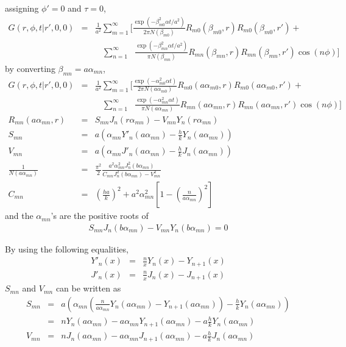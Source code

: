 \documentclass{article}
\begin{document}
assigning $\phi' = 0$ and $\tau = 0$,
\begin{eqnarray}
    G(r, \phi, t | r', 0, 0) &=&
    \frac{1}{a^2} \sum_{m=1}^{\infty} \Bigg[
    \frac{\exp(-\beta_{m0}^2\alpha t/a^2)}{2\pi N(\beta_{m0})}
    R_{m0}(\beta_{m0}, r) R_{m0}(\beta_{m0}, r') +
\nonumber\\
    & &\ \ \ \ \sum_{n=1}^{\infty}\ \ \ 
    \frac{\exp(-\beta_{mn}^2\alpha t/a^2)}{\pi N(\beta_{mn})}
    R_{mn}(\beta_{mn}, r) R_{mn}(\beta_{mn}, r')\cos(n\phi)\Bigg]
\end{eqnarray}
%
by converting $\beta_{mn} = a\alpha_{mn}$,
%
\begin{eqnarray}
    G(r, \phi, t | r', 0, 0) &=&
    \frac{1}{a^2} \sum_{m=1}^{\infty} \Bigg[
    \frac{\exp(-\alpha_{m0}^2\alpha t)}{2\pi N(a\alpha_{m0})}
    R_{m0}(a\alpha_{m0}, r) R_{m0}(a\alpha_{m0}, r') +
\nonumber\\
    & &\ \ \ \ \sum_{n=1}^{\infty}\ \ \ 
    \frac{\exp(-\alpha_{mn}^2\alpha t)}{\pi N(a\alpha_{mn})}
    R_{mn}(a\alpha_{mn}, r) R_{mn}(a\alpha_{mn}, r')\cos(n\phi)\Bigg]
\\
    R_{mn}(a\alpha_{mn}, r) &=& S_{mn}J_n(r\alpha_{mn}) - V_{mn}Y_n(r\alpha_{mn})
\\
    S_{mn} &=& a\left(\alpha_{mn}Y'_n(a\alpha_{mn}) - \frac{h}{k}Y_n(a\alpha_{mn})\right)
\\
    V_{mn} &=& a\left(\alpha_{mn}J'_n(a\alpha_{mn}) - \frac{h}{k}J_n(a\alpha_{mn})\right)
\\
    \frac{1}{N(a\alpha_{mn})} &=&
        \frac{\pi^2}{2} \frac{a^2\alpha_{mn}^2 J_n^2(b\alpha_{mn})}
        {C_{mn}J_n^2(b\alpha_{mn}) - V_{mn}^2}
\\
    C_{mn} &=& \left(\frac{ha}{k}\right)^2 + a^2\alpha_{mn}^2\left[1 - \left(\frac{n}{a\alpha_{mn}}\right)^2\right]
\end{eqnarray}
%
and the $\alpha_{mn}$'s are the positive roots of
%
\begin{eqnarray}
    S_{mn}J_n(b\alpha_{mn}) - V_{mn}Y_n(b\alpha_{mn}) = 0
\end{eqnarray}

By using the following equalities,
\begin{eqnarray}
    Y'_n(x) &=&  \frac{n}{x}Y_n(x) - Y_{n+1}(x) \\
    J'_n(x) &=&  \frac{n}{x}J_n(x) - J_{n+1}(x)
\end{eqnarray}
$S_{mn}$ and $V_{mn}$ can be written as
\begin{eqnarray}
    S_{mn} &=& a\left(\alpha_{mn}\left(\frac{n}{a\alpha_{mn}}Y_n(a\alpha_{mn}) - Y_{n+1}(a\alpha_{mn})\right) -
                      \frac{h}{k}Y_n(a\alpha_{mn})\right) \nonumber\\
           &=& nY_n(a\alpha_{mn}) - a\alpha_{mn}Y_{n+1}(a\alpha_{mn}) - a\frac{h}{k}Y_n(a\alpha_{mn}) \nonumber\\
    V_{mn} &=& nJ_n(a\alpha_{mn}) - a\alpha_{mn}J_{n+1}(a\alpha_{mn}) - a\frac{h}{k}J_n(a\alpha_{mn})
\end{eqnarray}
\end{document}
